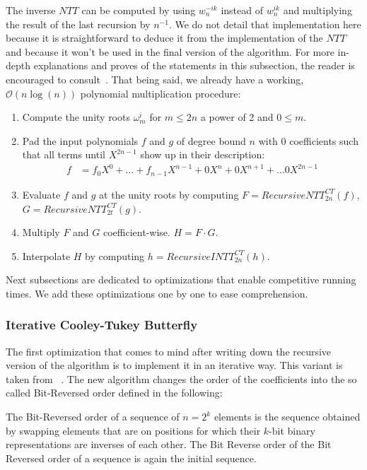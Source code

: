 The inverse $NTT$ can be computed by using $w_n^{-ik}$ instead of $w_n^{ik}$ and multiplying the result of the last recursion by $n^{-1}$. We do not detail that implementation here because it is straightforward to deduce it from the implementation of the $NTT$ and because it won't be used in the final version of the algorithm. For more in-depth explanations and proves of the statements in this subsection, the reader is encouraged to consult~\parencite{10.5555/1614191}. That being said, we already have a working, $\mathcal{O}(n \log(n))$ polynomial multiplication procedure:

\begin{enumerate}
    \item Compute the unity roots $\omega_m^i$ for $m \leq 2n$ a power of 2 and $0 \leq m$.
    
    \item Pad the input polynomials $f$ and $g$ of degree bound $n$ with $0$ coefficients such that all terms until $X^{2n - 1}$ show up in their description: 
    \begin{align*}
        f &= f_0 X^0 + \ldots + f_{n-1} X^{n-1}+ 0 X^{n} + 0 X^{n + 1} + \ldots 0 X^{2n - 1}
    \end{align*}

    \item Evaluate $f$ and $g$ at the unity roots by computing $F = RecursiveNTT_{2n}^{CT}(f)$, $G = RecursiveNTT_{2t}^{CT}(g)$.
    \item Multiply $F$ and $G$ coefficient-wise. $H = F \cdot G$.
    \item Interpolate $H$ by computing $h = RecursiveINTT_{2n}^{CT}(h)$.
\end{enumerate}

Next subsections are dedicated to optimizations that enable competitive running times. We add these optimizations one by one to ease comprehension.

\subsubsection{Iterative Cooley-Tukey Butterfly}

The first optimization that comes to mind after writing down the recursive version of the algorithm is to implement it in an iterative way. This variant is taken from ~\parencite{cryptoeprint:2013/866}. The new algorithm changes the order of the coefficients into the so called Bit-Reversed order defined in the following:

\begin{definition}
    The Bit-Reversed order of a sequence of $n = 2^k$ elements is the sequence obtained by swapping elements that are on positions for which their $k$-bit binary representations are inverses of each other. The Bit Reverse order of the Bit Reversed order of a sequence is again the initial sequence.
\end{definition}

